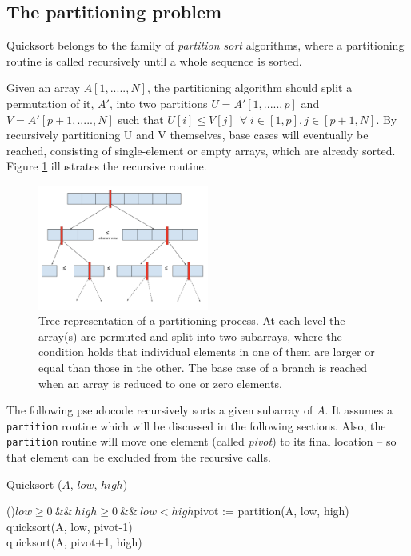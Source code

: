 \documentclass[]{finalproject}
\begin{document}
\subsection{The partitioning problem}

Quicksort belongs to the family of \textit{partition sort} algorithms, where a partitioning routine is called recursively until a whole sequence is sorted.

Given an array $A[1,.....,N]$, the partitioning algorithm should split a permutation of it, $A'$, into two partitions $U=A'[1,.....,p]$ and $V=A'[p+1,.....,N]$ such that $U[i] \leq V[j] \;\, \forall \; i \in [1,p], j \in [p+1,N]$. By recursively partitioning U and V themselves, base cases will eventually be reached, consisting of single-element or empty arrays, which are already sorted. Figure \ref{fig:rec-part} illustrates the recursive routine.

\begin{figure}[H]
\centering
\includegraphics[width=0.5\textwidth]{recursive_partitioning.png}
\caption{Tree representation of a partitioning process.
At each level the array(s) are permuted and split into two subarrays, where the condition holds that individual elements in one of them are larger or equal than those in the other.
The base case of a branch is reached when an array is reduced to one or zero elements.}
\label{fig:rec-part}
\end{figure}

The following pseudocode recursively sorts a given subarray of $A$. It assumes a \texttt{partition} routine which will be discussed in the following sections. Also, the \texttt{partition} routine will move one element (called \textit{pivot}) to its final location -- so that element can be excluded from the recursive calls.

\begin{algorithm}
\caption{Quicksort ($A$, $low$, $high$)}
\label{alg:p1}
\If(){$low \geq 0 ~\&\&~ high \geq 0 ~\&\&~ low < high$}{pivot := partition(A, low, high)\\
quicksort(A, low, pivot-1)\\
quicksort(A, pivot+1, high)}
\end{algorithm}
\end{document}
